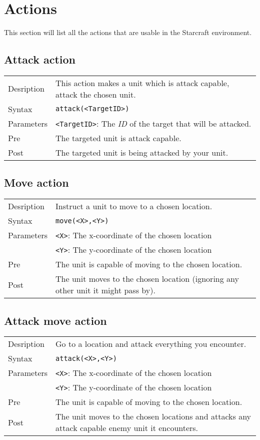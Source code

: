 \chapter{Actions}
This section will list all the actions that are usable in the Starcraft environment.

\section{Attack action}
\begin{tabularx}{\textwidth}{lX}
 Desription & This action makes a unit which is attack capable, attack the chosen unit. \\
 Syntax & \verb|attack(<TargetID>)| \\
 Parameters & \verb|<TargetID>|: The \textit{ID} of the target that will be attacked.\\
 Pre & The targeted unit is attack capable. \\
 Post &  The targeted unit is being attacked by your unit.
\end{tabularx}

\section{Move action}
\begin{tabularx}{\textwidth}{lX}
 Desription & Instruct a unit to move to a chosen location. \\
 Syntax & \verb|move(<X>,<Y>)| \\
 Parameters & \verb|<X>|: The x-coordinate of the chosen location \\
            &  \verb|<Y>|: The y-coordinate of the chosen location \\
 Pre & The unit is capable of moving to the chosen location. \\
 Post & The unit moves to the chosen location (ignoring any other unit it might pass by).
\end{tabularx}

\section{Attack move action}
\begin{tabularx}{\textwidth}{lX}
 Desription & Go to a location and attack everything you encounter. \\
 Syntax & \verb|attack(<X>,<Y>)| \\
 Parameters & \verb|<X>|: The x-coordinate of the chosen location \\
            & \verb|<Y>|: The y-coordinate of the chosen location \\
 Pre & The unit is capable of moving to the chosen location. \\
 Post & The unit moves to the chosen locations and attacks any attack capable enemy unit it encounters.
\end{tabularx}

